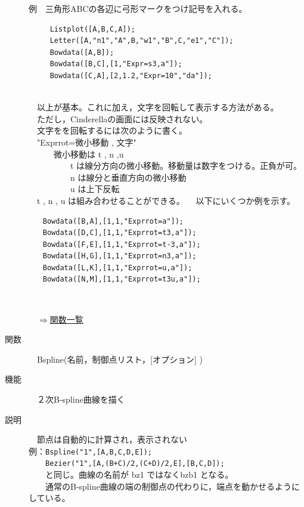 \documentclass[papersize,a4paper,12pt,uplatex]{jsarticle}
\begin{document}
\begin{description}
例　三角形ABCの各辺に弓形マークをつけ記号を入れる。
\begin{verbatim}
　　　Listplot([A,B,C,A]);
　　　Letter([A,"n1","A",B,"w1","B",C,"e1","C"]);
　　　Bowdata([A,B]);
　　　Bowdata([B,C],[1,"Expr=s3,a"]);
　　　Bowdata([C,A],[2,1.2,"Expr=10","da"]);
\end{verbatim}
　　　\\

　以上が基本。これに加え，文字を回転して表示する方法がある。\\
　ただし，Cinderellaの画面には反映されない。\\
　文字をを回転するには次のように書く。\\
　"Exprrot=微小移動 , 文字"\\
　　　微小移動は t , n ,u \\
　　　　　t は線分方向の微小移動。移動量は数字をつける。正負が可。\\
　　　　　n は線分と垂直方向の微小移動\\
　　　　　u は上下反転\\
　t , n , u は組み合わせることができる。
　以下にいくつか例を示す。
\begin{verbatim}
　　Bowdata([B,A],[1,1,"Exprrot=a"]);
　　Bowdata([D,C],[1,1,"Exprrot=t3,a"]);
　　Bowdata([F,E],[1,1,"Exprrot=t-3,a"]);
　　Bowdata([H,G],[1,1,"Exprrot=n3,a"]);
　　Bowdata([L,K],[1,1,"Exprrot=u,a"]);
　　Bowdata([N,M],[1,1,"Exprrot=t3u,a"]);
\end{verbatim}
　\\

\begin{flushright}　\hyperlink{functionlist}{$\Rightarrow$関数一覧}\end{flushright}

\hypertarget{bspline}{}
\item[関数]　Bspline(名前，制御点リスト，[オプション] )
\item[機能]　２次B-spline曲線を描く
\item[説明]　節点は自動的に計算され，表示されない\\


例：\verb|Bspline("1",[A,B,C,D,E]);|\\
　　\verb|Bezier("1",[A,(B+C)/2,(C+D)/2,E],[B,C,D]);|\\
　　と同じ。曲線の名前が bz1 ではなくbzb1 となる。\\
　　通常のB-spline曲線の端の制御点の代わりに，端点を動かせるようにしている。\\
　　　　



\end{description}
\end{document}
